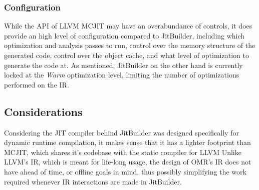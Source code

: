 \subsubsection{Configuration}
While the API of LLVM MCJIT may have an overabundance of controls, it does provide an high level of configuration compared to JitBuilder, including which optimization and analysis passes to run, control over the memory structure of the generated code, control over the object cache, and what level of optimization to generate the code at.
As mentioned, JitBuilder on the other hand is currently locked at the \textit{Warm} optimization level, limiting the number of optimizations performed on the IR.

\subsection{Considerations}
Considering the JIT compiler behind JitBuilder was designed specifically for dynamic runtime compilation, it makes sense that it has a lighter footprint than MCJIT, which shares it's codebase with the static compiler for LLVM
Unlike LLVM's IR, which is meant for life-long usage, the design of OMR's IR does not have ahead of time, or offline goals in mind, thus
possibly simplifying the work required whenever IR interactions are made in JitBuilder.
